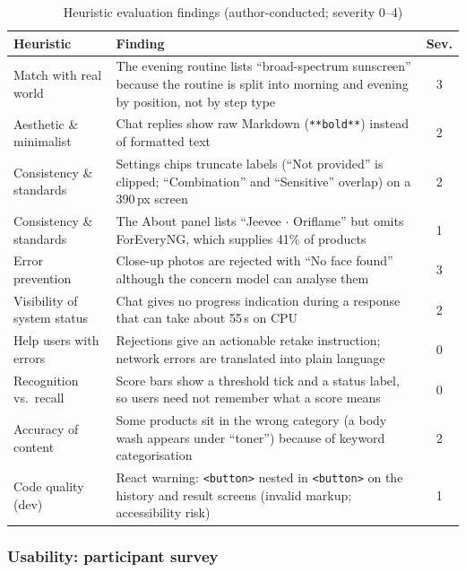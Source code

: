 \begin{table}[ht]
\centering\small
\caption{Heuristic evaluation findings (author-conducted; severity 0--4)}
\label{tab:heuristic}
\begin{tabularx}{\linewidth}{P{3.3cm}Yc}
\toprule
\textbf{Heuristic} & \textbf{Finding} & \textbf{Sev.}\\
\midrule
Match with real world & The evening routine lists ``broad-spectrum sunscreen'' because the routine is split into morning and evening by position, not by step type & 3\\
Aesthetic \& minimalist & Chat replies show raw Markdown (\texttt{**bold**}) instead of formatted text & 2\\
Consistency \& standards & Settings chips truncate labels (``Not provided'' is clipped; ``Combination'' and ``Sensitive'' overlap) on a 390\,px screen & 2\\
Consistency \& standards & The About panel lists ``Jeevee $\cdot$ Oriflame'' but omits ForEveryNG, which supplies 41\% of products & 1\\
Error prevention & Close-up photos are rejected with ``No face found'' although the concern model can analyse them & 3\\
Visibility of system status & Chat gives no progress indication during a response that can take about 55\,s on CPU & 2\\
Help users with errors & Rejections give an actionable retake instruction; network errors are translated into plain language & 0\\
Recognition vs.\ recall & Score bars show a threshold tick and a status label, so users need not remember what a score means & 0\\
Accuracy of content & Some products sit in the wrong category (a body wash appears under ``toner'') because of keyword categorisation & 2\\
Code quality (dev) & React warning: \texttt{<button>} nested in \texttt{<button>} on the history and result screens (invalid markup; accessibility risk) & 1\\
\bottomrule
\end{tabularx}
\end{table}

\subsubsection*{Usability: participant survey}
\label{sec:survey}

